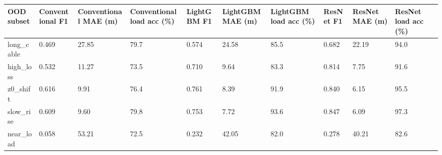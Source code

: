 \begin{tabular}{llllllllll}
\toprule
OOD subset & Conventional F1 & Conventional MAE (m) & Conventional load acc (\%) & LightGBM F1 & LightGBM MAE (m) & LightGBM load acc (\%) & ResNet F1 & ResNet MAE (m) & ResNet load acc (\%) \\
\midrule
long\_cable & 0.469 & 27.85 & 79.7 & 0.574 & 24.58 & 85.5 & 0.682 & 22.19 & 94.0 \\
high\_loss & 0.532 & 11.27 & 73.5 & 0.710 & 9.64 & 83.3 & 0.814 & 7.75 & 91.6 \\
z0\_shift & 0.616 & 9.91 & 76.4 & 0.761 & 8.39 & 91.9 & 0.840 & 6.15 & 95.5 \\
slow\_rise & 0.609 & 9.60 & 79.8 & 0.753 & 7.72 & 93.6 & 0.847 & 6.09 & 97.3 \\
near\_load & 0.058 & 53.21 & 72.5 & 0.232 & 42.05 & 82.0 & 0.278 & 40.21 & 82.6 \\
\bottomrule
\end{tabular}
